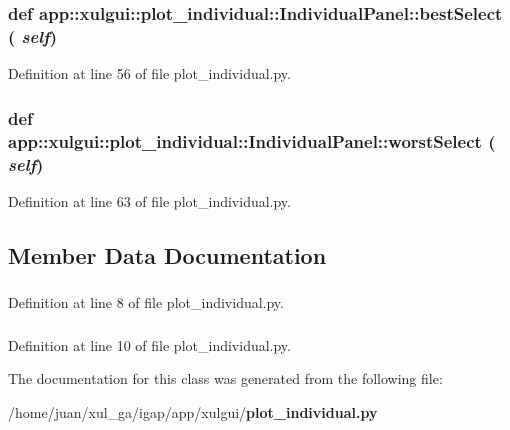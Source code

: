 \subsubsection{\setlength{\rightskip}{0pt plus 5cm}def app::xulgui::plot\_\-individual::IndividualPanel::bestSelect ( {\em self})}\label{classapp_1_1xulgui_1_1plot__individual_1_1IndividualPanel_2f83bcc77d2a5084f68e4fb4559dfd27}




Definition at line 56 of file plot\_\-individual.py.
\subsubsection{\setlength{\rightskip}{0pt plus 5cm}def app::xulgui::plot\_\-individual::IndividualPanel::worstSelect ( {\em self})}\label{classapp_1_1xulgui_1_1plot__individual_1_1IndividualPanel_db2d1aadef08596147e354322240822d}




Definition at line 63 of file plot\_\-individual.py.

\subsection{Member Data Documentation}
\subsubsection{}\label{classapp_1_1xulgui_1_1plot__individual_1_1IndividualPanel_02aedd86f0444c740cbef7603d9d7da2}




Definition at line 8 of file plot\_\-individual.py.
\subsubsection{}\label{classapp_1_1xulgui_1_1plot__individual_1_1IndividualPanel_6e1c22483797ae3bb3556c8aa5d71f98}




Definition at line 10 of file plot\_\-individual.py.

The documentation for this class was generated from the following file:\begin{CompactItemize}
\item 
/home/juan/xul\_\-ga/igap/app/xulgui/{\bf plot\_\-individual.py}\end{CompactItemize}

